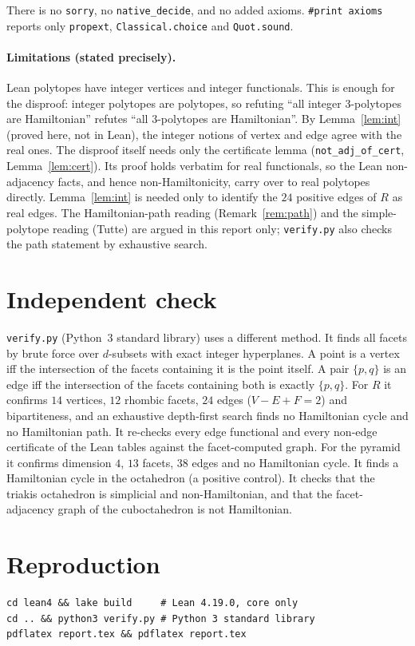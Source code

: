 \documentclass[11pt]{article}
\theoremstyle{definition}
\theoremstyle{remark}
\begin{document}
There is no \texttt{sorry}, no \texttt{native\_decide}, and no added axioms.
\texttt{\#print axioms} reports only \texttt{propext}, \texttt{Classical.choice}
and \texttt{Quot.sound}.

\paragraph{Limitations (stated precisely).} Lean polytopes have integer
vertices and integer functionals. This is enough for the disproof: integer
polytopes are polytopes, so refuting ``all integer 3-polytopes are Hamiltonian''
refutes ``all 3-polytopes are Hamiltonian''. By Lemma~\ref{lem:int} (proved here,
not in Lean), the integer notions of vertex and edge agree with the real ones.
The disproof itself needs only the certificate lemma (\texttt{not\_adj\_of\_cert},
Lemma~\ref{lem:cert}). Its proof holds verbatim for real functionals, so the Lean
non-adjacency facts, and hence non-Hamiltonicity, carry over to real polytopes
directly. Lemma~\ref{lem:int} is needed only to identify the $24$ positive edges
of $R$ as real edges. The
Hamiltonian-path reading (Remark~\ref{rem:path}) and the simple-polytope reading
(Tutte) are argued in this report only; \texttt{verify.py} also checks the path
statement by exhaustive search.

\section{Independent check}
\texttt{verify.py} (Python~3 standard library) uses a different method. It
finds all facets by brute force over $d$-subsets with exact integer hyperplanes.
A point is a vertex iff the intersection of the facets containing it is the point
itself. A pair $\{p,q\}$ is an edge iff the intersection of the facets containing
both is exactly $\{p,q\}$. For $R$ it confirms $14$ vertices, $12$ rhombic facets,
$24$ edges ($V-E+F=2$) and bipartiteness, and an exhaustive depth-first search
finds no Hamiltonian cycle and no Hamiltonian path. It re-checks every edge
functional and every non-edge certificate of the Lean tables against the
facet-computed graph. For the pyramid it confirms dimension $4$, $13$ facets,
$38$ edges and no Hamiltonian cycle. It finds a Hamiltonian cycle in the octahedron
(a positive control). It checks that the triakis octahedron is simplicial and
non-Hamiltonian, and that the facet-adjacency graph of the cuboctahedron is not
Hamiltonian.

\section{Reproduction}
\begin{verbatim}
cd lean4 && lake build     # Lean 4.19.0, core only
cd .. && python3 verify.py # Python 3 standard library
pdflatex report.tex && pdflatex report.tex
\end{verbatim}
\end{document}
